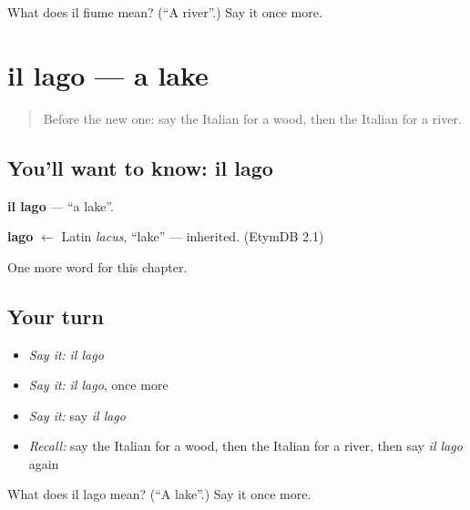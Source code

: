 \begin{tcolorbox}[breakable,colback=teal!4,colframe=teal!35!black,title={Before you move on}]
What does il fiume mean? (\textquotedblleft{}A river\textquotedblright{}.) Say it once more.
\end{tcolorbox}
\section[il lago]{il lago — a lake}

\label{lesson:IT-C65-lago}



\begin{quote}
Before the new one: say the Italian for a wood, then the Italian for a river.
\end{quote}

\subsection*{You'll want to know: il lago}
\textbf{il lago} — \textquotedblleft{}a lake\textquotedblright{}.

\begin{cousinweb}
\textbf{lago} $\leftarrow$ Latin \emph{lacus}, \textquotedblleft{}lake\textquotedblright{} — inherited. (EtymDB 2.1)
\end{cousinweb}

\begin{grammarlens}[title={What you've built}]
One more word for this chapter.
\end{grammarlens}

\subsection*{Your turn}
\begin{itemize}
\raggedright
  \item \emph{Say it:} \emph{il lago}
  \item \emph{Say it:} \emph{il lago}, once more
  \item \emph{Say it:} say \emph{il lago}
  \item \emph{Recall:} say the Italian for a wood, then the Italian for a river, then say \emph{il lago} again
\end{itemize}

\begin{tcolorbox}[breakable,colback=teal!4,colframe=teal!35!black,title={Before you move on}]
What does il lago mean? (\textquotedblleft{}A lake\textquotedblright{}.) Say it once more.
\end{tcolorbox}
